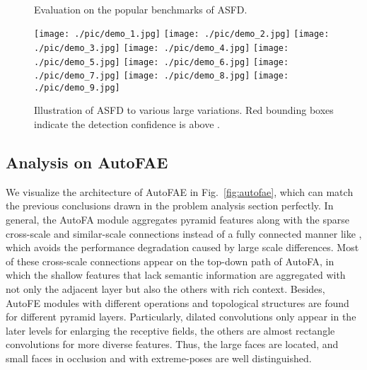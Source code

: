 \documentclass[sigconf]{acmart}
\begin{document}
\begin{figure}[!t]
    \centering
    \\
    \vspace{-2.5mm}
    \caption{Evaluation on the popular benchmarks of ASFD.}
    \vspace{-3.5mm}
    \label{fig:benchmarks}
\end{figure}


\begin{figure*}[!t]
    \centering
    \texttt{[image: ./pic/demo\_1.jpg]}
    \texttt{[image: ./pic/demo\_2.jpg]}
    \texttt{[image: ./pic/demo\_3.jpg]}
    \vfill
    \texttt{[image: ./pic/demo\_4.jpg]}
    \texttt{[image: ./pic/demo\_5.jpg]}
    \texttt{[image: ./pic/demo\_6.jpg]}
    \vfill
    \texttt{[image: ./pic/demo\_7.jpg]}
    \texttt{[image: ./pic/demo\_8.jpg]}
    \texttt{[image: ./pic/demo\_9.jpg]}
    \vfill
    \vspace{-2.5mm}
    \caption{Illustration of ASFD to various large variations. Red bounding boxes indicate the detection confidence is above .}
    \vspace{-3mm}
    \label{fig:visual_demo}
\end{figure*}


\subsection{Analysis on AutoFAE}
We visualize the architecture of AutoFAE in Fig.~\ref{fig:autofae}, which can match the previous conclusions drawn in the problem analysis section perfectly. 
In general, the AutoFA module aggregates pyramid features along with the sparse cross-scale and similar-scale connections instead of a fully connected manner like \cite{xu2019autofpn,wang2019nasfcos}, which avoids the performance degradation caused by large scale differences. 
Most of these cross-scale connections appear on the top-down path of AutoFA, in which the shallow features that lack semantic information are aggregated with not only the adjacent layer but also the others with rich context. 
Besides, AutoFE modules with different operations and topological structures are found for different pyramid layers. Particularly, dilated convolutions only appear in the later levels for enlarging the receptive fields, the others are almost rectangle convolutions for more diverse features. Thus, the large faces are located, and small faces in occlusion and with extreme-poses are well distinguished.
\end{document}
